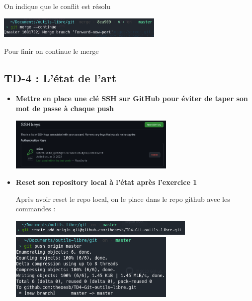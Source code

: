 \documentclass[12pt]{article}
\begin{document}
\begin{itemize}
  On indique que le conflit est résolu
  \vspace{0.3cm}

  \includegraphics[width=8cm]{images/screen-git-td3-9.png}
  \vspace{0.3cm}

  Pour finir on continue le merge
\end{itemize}
\vspace{0.3cm}

  \subsection{TD-4 : L'état de l'art}
  \vspace{0.3cm}

\begin{itemize}
  \item \textbf{Mettre en place une clé SSH sur GitHub pour éviter de taper son mot de passe à chaque push}
  \vspace{0.3cm}

  \includegraphics[width=8cm]{images/screen-git-td4-1.png}
\end{itemize}
\vspace{0.3cm}

\begin{itemize}
  \item \textbf{Reset son repository local à l'état après l'exercice 1}
  \vspace{0.3cm}

  Après avoir reset le repo local, on le place dans le repo github avec les commandes : \newline

  \includegraphics[width=9cm]{images/screen-git-td4-2.png} \newline
  \includegraphics[width=8cm]{images/screen-git-td4-3.png}
\end{itemize}
\end{document}
